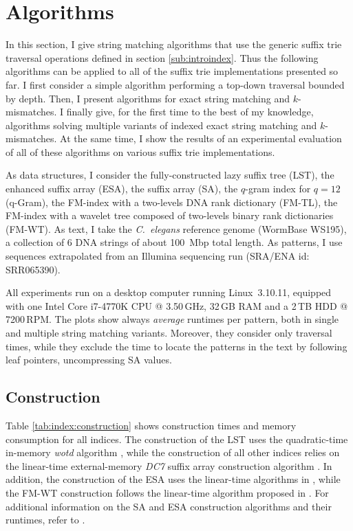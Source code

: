 \section{Algorithms}
\label{sec:index:algo}

In this section, I give string matching algorithms that use the generic suffix trie traversal operations defined in section \ref{sub:introindex}.
Thus the following algorithms can be applied to all of the suffix trie implementations presented so far.
I first consider a simple algorithm performing a top-down traversal bounded by depth.
Then, I present algorithms for exact string matching and $k$-mismatches.%
I finally give, for the first time to the best of my knowledge, algorithms solving multiple variants of indexed exact string matching and $k$-mismatches.
At the same time, I show the results of an experimental evaluation of all of these algorithms on various suffix trie implementations.

As data structures, I consider the fully-constructed lazy suffix tree (LST), the enhanced suffix array (ESA), the suffix array (SA), the $q$-gram index for $q=12$ (q-Gram), the FM-index with a two-levels DNA rank dictionary (FM-TL), the FM-index with a wavelet tree composed of two-levels binary rank dictionaries (FM-WT).
As text, I take the \emph{C.~elegans} reference genome (WormBase WS195), \ie a collection of 6 DNA strings of about 100~Mbp total length.
As patterns, I use sequences extrapolated from an Illumina sequencing run (SRA/ENA id: SRR065390).

All experiments run on a desktop computer running Linux~3.10.11, equipped with one Intel\textsuperscript{\textregistered} Core i7-4770K CPU @ 3.50\,GHz, 32\,GB RAM and a 2\,TB HDD @ 7200\,RPM.
The plots show always \emph{average} runtimes per pattern, both in single and multiple string matching variants.
Moreover, they consider only traversal times, while they exclude the time to locate the patterns in the text by following leaf pointers, \eg uncompressing SA values.

\subsection{Construction}
\label{sec:index:algo:construction}

Table \ref{tab:index:construction} shows construction times and memory consumption for all indices.
The construction of the LST uses the quadratic-time in-memory \emph{wotd} algorithm \citep{Giegerich1999}, while the construction of all other indices relies on the linear-time external-memory \emph{DC7} suffix array construction algorithm \citep{Dementiev2008}.
In addition, the construction of the ESA uses the linear-time algorithms in \citep{Kasai2001,Abouelhoda2004}, while the FM-WT construction follows the linear-time algorithm proposed in \citep{Grossi2003}.
For additional information on the SA and ESA construction algorithms and their runtimes, refer to \citep{Weese2013}.

